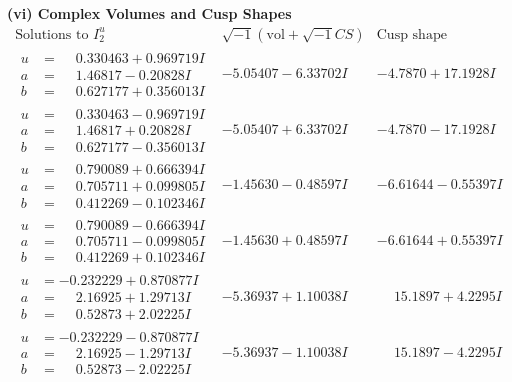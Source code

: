 \documentclass[1p]{elsarticle_modified}
\theoremstyle{definition}
\newcommand{\I}{\sqrt{-1}}
\begin{document}
\newpage\flushleft \textbf{(vi) Complex Volumes and Cusp Shapes}
$$\begin{array}{c|c|c}  
\text{Solutions to }I^u_{2}& \I (\text{vol} + \sqrt{-1}CS) & \text{Cusp shape}\\
 \hline 
\begin{aligned}
u &= \phantom{-}0.330463 + 0.969719 I \\
a &= \phantom{-}1.46817 - 0.20828 I \\
b &= \phantom{-}0.627177 + 0.356013 I\end{aligned}
 & -5.05407 - 6.33702 I & -4.7870 + 17.1928 I \\ \hline\begin{aligned}
u &= \phantom{-}0.330463 - 0.969719 I \\
a &= \phantom{-}1.46817 + 0.20828 I \\
b &= \phantom{-}0.627177 - 0.356013 I\end{aligned}
 & -5.05407 + 6.33702 I & -4.7870 - 17.1928 I \\ \hline\begin{aligned}
u &= \phantom{-}0.790089 + 0.666394 I \\
a &= \phantom{-}0.705711 + 0.099805 I \\
b &= \phantom{-}0.412269 - 0.102346 I\end{aligned}
 & -1.45630 - 0.48597 I & -6.61644 - 0.55397 I \\ \hline\begin{aligned}
u &= \phantom{-}0.790089 - 0.666394 I \\
a &= \phantom{-}0.705711 - 0.099805 I \\
b &= \phantom{-}0.412269 + 0.102346 I\end{aligned}
 & -1.45630 + 0.48597 I & -6.61644 + 0.55397 I \\ \hline\begin{aligned}
u &= -0.232229 + 0.870877 I \\
a &= \phantom{-}2.16925 + 1.29713 I \\
b &= \phantom{-}0.52873 + 2.02225 I\end{aligned}
 & -5.36937 + 1.10038 I & \phantom{-}15.1897 + 4.2295 I \\ \hline\begin{aligned}
u &= -0.232229 - 0.870877 I \\
a &= \phantom{-}2.16925 - 1.29713 I \\
b &= \phantom{-}0.52873 - 2.02225 I\end{aligned}
 & -5.36937 - 1.10038 I & \phantom{-}15.1897 - 4.2295 I \\ \hline\begin{aligned}

\end{aligned}
\end{array}$$
\end{document}
